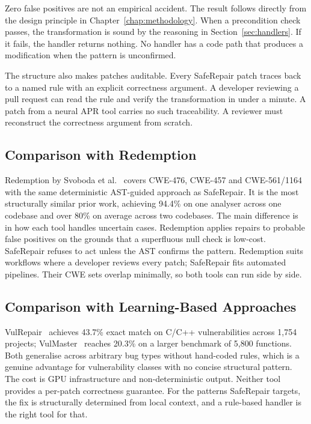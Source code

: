 Zero false positives are not an empirical accident. The result follows directly from the design principle in Chapter~\ref{chap:methodology}. When a precondition check passes, the transformation is sound by the reasoning in Section~\ref{sec:handlers}. If it fails, the handler returns nothing. No handler has a code path that produces a modification when the pattern is unconfirmed.

The structure also makes patches auditable. Every SafeRepair patch traces back to a named rule with an explicit correctness argument. A developer reviewing a pull request can read the rule and verify the transformation in under a minute. A patch from a neural APR tool carries no such traceability. A reviewer must reconstruct the correctness argument from scratch.

\subsection{Comparison with Redemption}

Redemption by Svoboda et al.~\cite{b2} covers CWE-476, CWE-457 and CWE-561/1164 with the same deterministic AST-guided approach as SafeRepair. It is the most structurally similar prior work, achieving 94.4\% on one analyser across one codebase and over 80\% on average across two codebases. The main difference is in how each tool handles uncertain cases. Redemption applies repairs to probable false positives on the grounds that a superfluous null check is low-cost. SafeRepair refuses to act unless the AST confirms the pattern. Redemption suits workflows where a developer reviews every patch; SafeRepair fits automated pipelines. Their CWE sets overlap minimally, so both tools can run side by side.

\subsection{Comparison with Learning-Based Approaches}

VulRepair~\cite{b4} achieves 43.7\% exact match on C/C++ vulnerabilities across 1,754 projects; VulMaster~\cite{b3} reaches 20.3\% on a larger benchmark of 5,800 functions. Both generalise across arbitrary bug types without hand-coded rules, which is a genuine advantage for vulnerability classes with no concise structural pattern. The cost is GPU infrastructure and non-deterministic output. Neither tool provides a per-patch correctness guarantee. For the patterns SafeRepair targets, the fix is structurally determined from local context, and a rule-based handler is the right tool for that.

